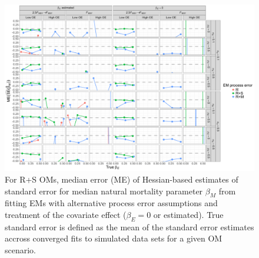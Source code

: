 \documentclass[
  12pt,
]{article}
\begin{document}
\begin{landscape}
\begin{figure}
\begin{center}
\includegraphics[height = \textheight]{se_beta_M_bias_RSom}
\end{center}
\caption{For R+S OMs, median error (ME) of Hessian-based estimates of standard error for median natural mortality parameter $\beta_M$ from fitting EMs with alternative process error assumptions and treatment of the covariate effect ($\beta_ E= 0$ or estimated). True standard error is defined as the mean of the standard error estimates accross converged fits to simulated data sets for a given OM scenario.}\label{se_beta_M_bias_RSom}
\end{figure}
\end{landscape}
\end{document}
